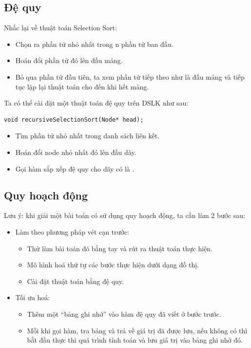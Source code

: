 \documentclass[main.tex]{subfiles}
\begin{document}

\subsection{Đệ quy}
Nhắc lại về thuật toán Selection Sort:
\begin{itemize}
	\item Chọn ra phần tử nhỏ nhất trong n phần tử ban đầu.
	\item Hoán đổi phần tử đó lên đầu mảng.
	\item Bỏ qua phần tử đầu tiên, ta xem phần tử tiếp theo như là đầu mảng và tiếp tục lặp lại thuật toán cho đến khi hết mảng.
\end{itemize}

Ta có thể cài đặt một thuật toán đệ quy trên DSLK như sau:

\begin{verbatim}
void recursiveSelectionSort(Node* head);
\end{verbatim}

\begin{itemize}
	\item Tìm phần tử nhỏ nhất trong danh sách liên kết.
	\item Hoán đổi node nhỏ nhất đó lên đầu dãy.
	\item Gọi hàm sắp xếp đệ quy cho dãy có  là .
\end{itemize}

\subsection{Quy hoạch động}
Lưu ý: khi giải một bài toán có sử dụng quy hoạch động, ta cần làm 2 bước sau:
\begin{itemize}
	\item Làm theo phương pháp vét cạn trước:
		\begin{itemize}
			\item Thử làm bài toán đó bằng tay và rút ra thuật toán thực hiện.
			\item Mô hình hoá thứ tự các bước thực hiện dưới dạng đồ thị.
			\item Cài đặt thuật toán bằng đệ quy.
		\end{itemize}
	\item Tối ưu hoá:
		\begin{itemize}
			\item Thêm một ``bảng ghi nhớ'' vào hàm đệ quy đã viết ở bước trước.
			\item Mỗi khi gọi hàm, tra bảng và trả về giá trị đã được lưu, nếu không có thì bắt đầu thực thi quá trình tính toán và lưu giá trị vào bảng ghi nhớ đó.
		\end{itemize}
\end{itemize}
\end{document}

